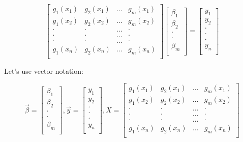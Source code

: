 \documentclass[10pt]{amsart}
\begin{document}
$$\left[\begin{matrix} g_1(x_1) & g_2(x_1) & \dots & g_m(x_1) \\ g_1(x_2) & g_2(x_2) & \dots & g_m(x_2) \\ \cdot & \cdot & \dots & \cdot \\  \cdot & \cdot & \dots & \cdot \\ \cdot & \cdot & \dots & \cdot \\ g_1(x_n) & g_2(x_n) & \dots & g_m(x_n) \\\end{matrix}\right]\left[ \begin{matrix} \beta_1 \\ \beta_2 \\ \cdot \\ \cdot \\ \beta_m \\\end{matrix}\right] = \left[\begin{matrix} y_1 \\ y_2 \\ \cdot \\ \cdot \\ \cdot \\ y_n \\\end{matrix}\right]$$

Let's use vector notation:

$$\vec{\beta} = \left[ \begin{matrix} \beta_1 \\ \beta_2 \\ \cdot \\ \cdot \\ \beta_m \\\end{matrix}\right], \vec{y} =  \left[\begin{matrix} y_1 \\ y_2 \\ \cdot \\ \cdot \\ \cdot \\ y_n \\\end{matrix}\right], X = \left[\begin{matrix} g_1(x_1) & g_2(x_1) & \dots & g_m(x_1) \\ g_1(x_2) & g_2(x_2) & \dots & g_m(x_2) \\ \cdot & \cdot & \dots & \cdot \\  \cdot & \cdot & \dots & \cdot \\ \cdot & \cdot & \dots & \cdot \\ g_1(x_n) & g_2(x_n) & \dots & g_m(x_n) \\\end{matrix}\right]$$
\end{document}
